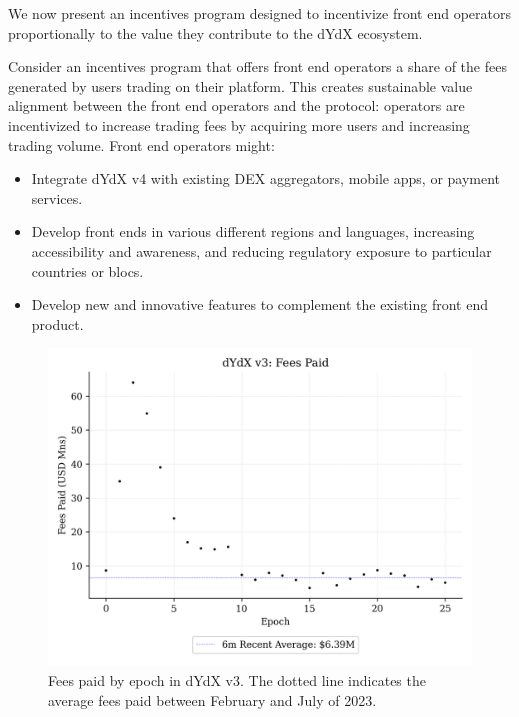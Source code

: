         We now present an incentives program designed to incentivize front end operators proportionally to the value they contribute to the dYdX ecosystem.
        
        Consider an incentives program that offers front end operators a share of the fees generated by users trading on their platform. This creates sustainable value alignment between the front end operators and the protocol: operators are incentivized to increase trading fees by acquiring more users and increasing trading volume. Front end operators might:

        \begin{itemize}
            \item Integrate dYdX v4 with existing DEX aggregators, mobile apps, or payment services.
            \item Develop front ends in various different regions and languages, increasing accessibility and awareness, and reducing regulatory exposure to particular countries or blocs.
            \item Develop new and innovative features to complement the existing front end product.
        \end{itemize}

        \begin{figure}[htp]
            \centering
            \includegraphics[width=0.6\linewidth]{figs/fees.png}
            \captionsetup{width=.6\linewidth}
            \caption{Fees paid by epoch in dYdX v3. The dotted line indicates the average fees paid between February and July of 2023.}
            \label{fig:fees}
        \end{figure}


